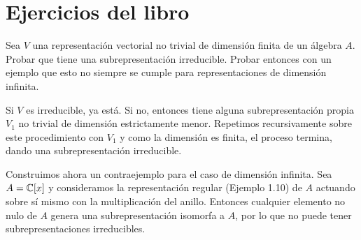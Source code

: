 \documentclass[twoside]{article}
\begin{document}
\section{Ejercicios del libro}

\begin{ejercicio}{1.20}
Sea $V$ una representación vectorial no trivial de dimensión finita de un álgebra $A$. Probar que tiene una subrepresentación irreducible. Probar entonces con un ejemplo que esto no siempre se cumple para representaciones de dimensión infinita.
\end{ejercicio}
\begin{solucion}
Si $V$ es irreducible, ya está. Si no, entonces tiene alguna subrepresentación propia $V_1$ no trivial de dimensión estrictamente menor. Repetimos recursivamente sobre este procedimiento con $V_1$ y como la dimensión es finita, el proceso termina, dando una subrepresentación irreducible.

Construimos ahora un contraejemplo para el caso de dimensión infinita. Sea $A=\mathbb{C}[x]$ y consideramos la representación regular (Ejemplo 1.10) de $A$ actuando sobre sí mismo con la multiplicación del anillo. Entonces cualquier elemento no nulo de $A$ genera una subrepresentación isomorfa a $A$, por lo que no puede tener subrepresentaciones irreducibles. 

%
%
\end{solucion}

\newpage
\end{document}
